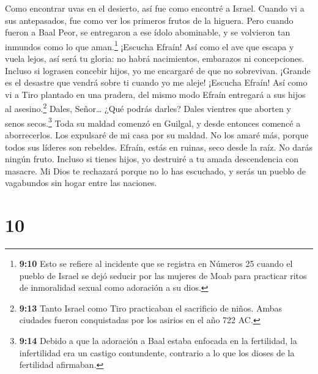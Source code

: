  Como encontrar uvas en el desierto, así fue como encontré
a Israel. Cuando vi a sus antepasados, fue como ver los primeros frutos
de la higuera. Pero cuando fueron a Baal Peor, se entregaron a ese ídolo
abominable, y se volvieron tan inmundos como lo que aman.\footnote{\textbf{9:10}
  Esto se refiere al incidente que se registra en Números 25 cuando el
  pueblo de Israel se dejó seducir por las mujeres de Moab para
  practicar ritos de inmoralidad sexual como adoración a su dios.}
 ¡Escucha Efraín! Así como el ave que escapa y vuela lejos,
así será tu gloria: no habrá nacimientos, embarazos ni concepciones.
 Incluso si lograsen concebir hijos, yo me encargaré de que
no sobrevivan. ¡Grande es el desastre que vendrá sobre ti cuando yo me
aleje!  ¡Escucha Efraín! Así como vi a Tiro plantado en una
pradera, del mismo modo Efraín entregará a sus hijos al
asesino.\footnote{\textbf{9:13} Tanto Israel como Tiro practicaban el
  sacrificio de niños. Ambas ciudades fueron conquistadas por los
  asirios en el año 722 AC.}  Dales, Señor\ldots{} ¿Qué
podrás darles? Dales vientres que aborten y senos secos.\footnote{\textbf{9:14}
  Debido a que la adoración a Baal estaba enfocada en la fertilidad, la
  infertilidad era un castigo contundente, contrario a lo que los dioses
  de la fertilidad afirmaban.}  Toda su maldad comenzó en
Guilgal, y desde entonces comencé a aborrecerlos. Los expulsaré de mi
casa por su maldad. No los amaré más, porque todos sus líderes son
rebeldes.  Efraín, estás en ruinas, seco desde la raíz. No
darás ningún fruto. Incluso si tienes hijos, yo destruiré a tu amada
descendencia con masacre.  Mi Dios te rechazará porque no
lo has escuchado, y serás un pueblo de vagabundos sin hogar entre las
naciones.

\hypertarget{section-9}{%
\section{10}\label{section-9}}

